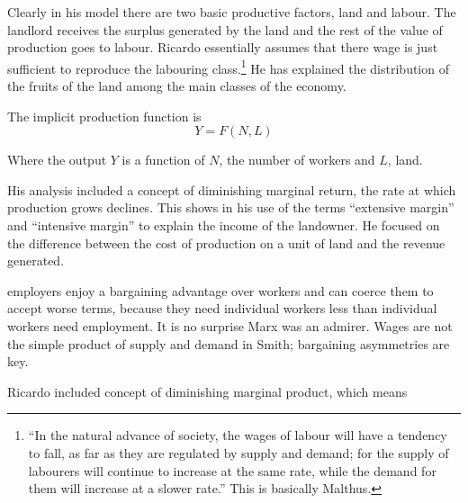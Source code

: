 Clearly in his model there are two basic productive factors, land and labour. The landlord  receives the surplus generated by the land and the rest of the value of production goes to labour. Ricardo essentially assumes that there wage is  just sufficient to reproduce the labouring class.\footnote{``In the natural advance of society, the wages of labour will have a tendency to fall, as far as they are regulated by supply and demand; for the supply of labourers will continue to increase at the same rate, while the demand for them will increase at a slower rate.''  This is  basically Malthus.} He has explained the distribution of the fruits of the land among the main classes of the economy.

The implicit production function is
\[Y=F(N, L)\]

Where the output $Y$ is a function of $N$, the number of workers and $L$, land.

His analysis included a concept of diminishing marginal return, the rate at which production grows declines. 
This shows in his use of the terms ``extensive margin'' and ``intensive margin'' to explain the income of the landowner. He focused on the difference between the cost of production on a unit of land and the revenue generated. 



employers enjoy a bargaining advantage over workers and can coerce them to accept worse terms, because they need individual workers less than individual workers need employment. It is no surprise Marx was an admirer. Wages are not the simple product of supply and demand in Smith; bargaining asymmetries are key.

Ricardo included concept of diminishing marginal product, which means



